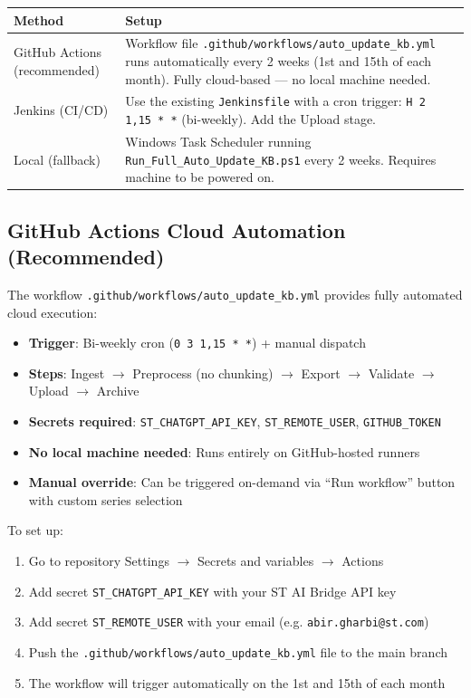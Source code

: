 \documentclass[12pt,a4paper]{report}
\begin{document}
\begin{longtable}{p{4cm}p{9cm}}
\toprule
\textbf{Method} & \textbf{Setup} \\
\midrule
GitHub Actions (recommended) & Workflow file \texttt{.github/workflows/auto\_update\_kb.yml} runs automatically every 2 weeks (1st and 15th of each month). Fully cloud-based --- no local machine needed. \\
Jenkins (CI/CD) & Use the existing \texttt{Jenkinsfile} with a cron trigger: \texttt{H 2 1,15 * *} (bi-weekly). Add the Upload stage. \\
Local (fallback) & Windows Task Scheduler running \texttt{Run\_Full\_Auto\_Update\_KB.ps1} every 2 weeks. Requires machine to be powered on. \\
\bottomrule
\end{longtable}

\subsection{GitHub Actions Cloud Automation (Recommended)}

The workflow \texttt{.github/workflows/auto\_update\_kb.yml} provides fully automated cloud execution:

\begin{itemize}
  \item \textbf{Trigger}: Bi-weekly cron (\texttt{0 3 1,15 * *}) + manual dispatch
  \item \textbf{Steps}: Ingest $\to$ Preprocess (no chunking) $\to$ Export $\to$ Validate $\to$ Upload $\to$ Archive
  \item \textbf{Secrets required}: \texttt{ST\_CHATGPT\_API\_KEY}, \texttt{ST\_REMOTE\_USER}, \texttt{GITHUB\_TOKEN}
  \item \textbf{No local machine needed}: Runs entirely on GitHub-hosted runners
  \item \textbf{Manual override}: Can be triggered on-demand via ``Run workflow'' button with custom series selection
\end{itemize}

To set up:
\begin{enumerate}
  \item Go to repository Settings $\to$ Secrets and variables $\to$ Actions
  \item Add secret \texttt{ST\_CHATGPT\_API\_KEY} with your ST AI Bridge API key
  \item Add secret \texttt{ST\_REMOTE\_USER} with your email (e.g. \texttt{abir.gharbi@st.com})
  \item Push the \texttt{.github/workflows/auto\_update\_kb.yml} file to the main branch
  \item The workflow will trigger automatically on the 1st and 15th of each month
\end{enumerate}
\end{document}

